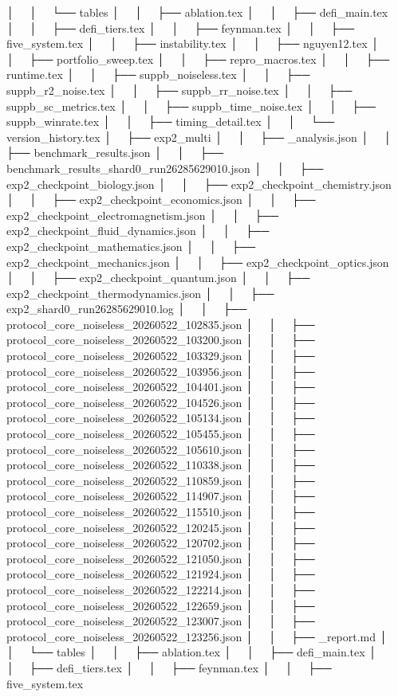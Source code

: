 │   │   └── tables
│   │       ├── ablation.tex
│   │       ├── defi_main.tex
│   │       ├── defi_tiers.tex
│   │       ├── feynman.tex
│   │       ├── five_system.tex
│   │       ├── instability.tex
│   │       ├── nguyen12.tex
│   │       ├── portfolio_sweep.tex
│   │       ├── repro_macros.tex
│   │       ├── runtime.tex
│   │       ├── suppb_noiseless.tex
│   │       ├── suppb_r2_noise.tex
│   │       ├── suppb_rr_noise.tex
│   │       ├── suppb_sc_metrics.tex
│   │       ├── suppb_time_noise.tex
│   │       ├── suppb_winrate.tex
│   │       ├── timing_detail.tex
│   │       └── version_history.tex
│   ├── exp2_multi
│   │   ├── _analysis.json
│   │   ├── benchmark_results.json
│   │   ├── benchmark_results_shard0_run26285629010.json
│   │   ├── exp2_checkpoint_biology.json
│   │   ├── exp2_checkpoint_chemistry.json
│   │   ├── exp2_checkpoint_economics.json
│   │   ├── exp2_checkpoint_electromagnetism.json
│   │   ├── exp2_checkpoint_fluid_dynamics.json
│   │   ├── exp2_checkpoint_mathematics.json
│   │   ├── exp2_checkpoint_mechanics.json
│   │   ├── exp2_checkpoint_optics.json
│   │   ├── exp2_checkpoint_quantum.json
│   │   ├── exp2_checkpoint_thermodynamics.json
│   │   ├── exp2_shard0_run26285629010.log
│   │   ├── protocol_core_noiseless_20260522_102835.json
│   │   ├── protocol_core_noiseless_20260522_103200.json
│   │   ├── protocol_core_noiseless_20260522_103329.json
│   │   ├── protocol_core_noiseless_20260522_103956.json
│   │   ├── protocol_core_noiseless_20260522_104401.json
│   │   ├── protocol_core_noiseless_20260522_104526.json
│   │   ├── protocol_core_noiseless_20260522_105134.json
│   │   ├── protocol_core_noiseless_20260522_105455.json
│   │   ├── protocol_core_noiseless_20260522_105610.json
│   │   ├── protocol_core_noiseless_20260522_110338.json
│   │   ├── protocol_core_noiseless_20260522_110859.json
│   │   ├── protocol_core_noiseless_20260522_114907.json
│   │   ├── protocol_core_noiseless_20260522_115510.json
│   │   ├── protocol_core_noiseless_20260522_120245.json
│   │   ├── protocol_core_noiseless_20260522_120702.json
│   │   ├── protocol_core_noiseless_20260522_121050.json
│   │   ├── protocol_core_noiseless_20260522_121924.json
│   │   ├── protocol_core_noiseless_20260522_122214.json
│   │   ├── protocol_core_noiseless_20260522_122659.json
│   │   ├── protocol_core_noiseless_20260522_123007.json
│   │   ├── protocol_core_noiseless_20260522_123256.json
│   │   ├── _report.md
│   │   └── tables
│   │       ├── ablation.tex
│   │       ├── defi_main.tex
│   │       ├── defi_tiers.tex
│   │       ├── feynman.tex
│   │       ├── five_system.tex
